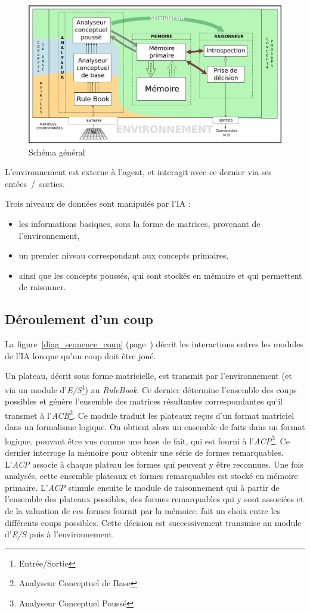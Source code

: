 \begin{figure}[H] 
\includegraphics[width=\textwidth]{files/simplified_general_diagram} 
\caption{Schéma général} 
\label{schema_general}
\end{figure}

L'environnement est externe à l'agent, et interagit avec ce dernier via ses entées~/~sorties.

Trois niveaux de données sont manipulés par l'IA :
\begin{itemize}
\item les informations basiques, sous la forme de matrices, provenant de l'environnement,
\item un premier niveau correspondant aux concepts primaires,
\item ainsi que les concepts poussés, qui sont stockés en mémoire et qui permettent de raisonner.
\end{itemize}

\subsection{Déroulement d'un coup}

La figure~\ref{diag_sequence_coup} (page~\pageref{diag_sequence_coup}) décrit les interactions entres les modules de l'IA lorsque qu'un coup doit être joué.

Un plateau, décrit sous forme matricielle, est transmit par l'environnement (et via un module d'\emph{E/S}\footnote{Entrée/Sortie}) au \emph{RuleBook}. Ce dernier détermine l'ensemble des coups possibles et génère l'ensemble des matrices résultantes correspondantes qu'il transmet à l'\emph{ACB}\footnote{Analyseur Conceptuel de Base}. Ce module traduit les plateaux reçus d'un format matriciel dans un formalisme logique. On obtient alors un ensemble de faits dans un format logique, pouvant être vus comme une base de fait, qui est fourni à l'\emph{ACP}\footnote{Analyseur Conceptuel Poussé}. Ce dernier interroge la mémoire pour obtenir une série de formes remarquables. L'\emph{ACP} associe à chaque plateau les formes qui peuvent y être reconnues. Une fois analysés, cette ensemble plateaux et formes remarquables est stocké en mémoire primaire. L'\emph{ACP} stimule ensuite le module de raisonnement qui à partir de l'ensemble des plateaux possibles, des formes remarquables qui y sont associées et de la valuation de ces formes fournit par la mémoire, fait un choix entre les différents coups possibles. Cette décision est successivement transmise au module d'\emph{E/S} puis à l'environnement.

